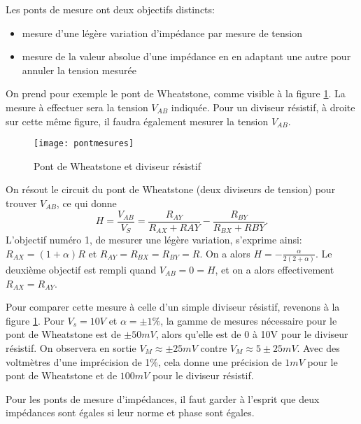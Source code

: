 Les ponts de mesure ont deux objectifs distincts: \begin{itemize}
\item mesure d'une légère variation d'impédance par mesure de tension
\item mesure de la valeur absolue d'une impédance en en adaptant une autre pour annuler la tension mesurée
\end{itemize}

On prend pour exemple le pont de Wheatstone, comme visible à la figure \ref{pontmesures}. La mesure à effectuer sera la tension $V_{AB}$ indiquée. Pour un diviseur résistif, à droite sur cette même figure, il faudra également mesurer la tension $V_{AB}$.
\begin{figure}[h]
\centering
\texttt{[image: pontmesures]}
\caption{Pont de Wheatstone et diviseur résistif}
\label{pontmesures}
\end{figure}
On résout le circuit du pont de Wheatstone (deux diviseurs de tension) pour trouver $V_{AB}$, ce qui donne
$$ H = \frac{V_{AB}}{V_S} = \frac{R_{AY}}{R_{AX} + R{AY}} - \frac{R_{BY}}{R_{BX} + R{BY}}.$$
L'objectif numéro 1, de mesurer une légère variation, s'exprime ainsi: $R_{AX} = (1+\alpha)R$ et $R_{AY} = R_{BX} = R_{BY} = R.$ On a alors $ H = -\frac{\alpha}{2(2+\alpha)}$. Le deuxième objectif est rempli quand $V_{AB} = 0 = H$, et on a alors effectivement $R_{AX} = R_{AY}$.

Pour comparer cette mesure à celle d'un simple diviseur résistif, revenons à la figure \ref{pontmesures}. Pour $V_s = 10V$ et $\alpha=\pm 1\%$, la gamme de mesures nécessaire pour le pont de Wheatstone est de $\pm 50mV$, alors qu'elle est de 0 à 10V pour le diviseur résistif. On observera en sortie $V_M \approx \pm 25mV$ contre $V_M \approx 5\pm 25mV$. Avec des voltmètres d'une imprécision de 1\%, cela donne une précision de $1mV$ pour le pont de Wheatstone et de $100mV$ pour le diviseur résistif.

Pour les ponts de mesure d'impédances, il faut garder à l'esprit que deux impédances sont égales si leur norme et phase sont égales.





